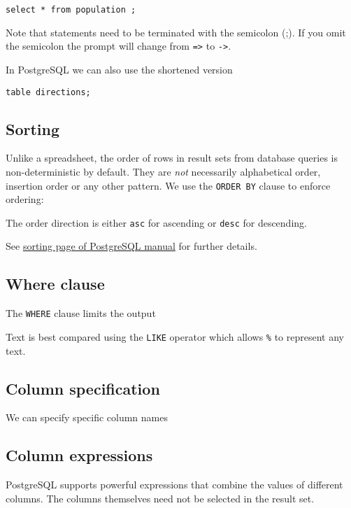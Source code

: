 \begin{verbatim}
select * from population ;
\end{verbatim}

Note that statements need to be terminated with the semicolon (;). If
you omit the semicolon the prompt will change from
\texttt{=\textgreater{}} to \texttt{-\textgreater{}}.

In PostgreSQL we can also use the shortened version

\begin{verbatim}
table directions;
\end{verbatim}

\subsection{Sorting}\label{sorting}

Unlike a spreadsheet, the order of rows in result sets from database
queries is non-deterministic by default. They are \emph{not} necessarily
alphabetical order, insertion order or any other pattern. We use the
\texttt{ORDER\ BY} clause to enforce ordering:

The order direction is either \texttt{asc} for ascending or
\texttt{desc} for descending.

See \href{https://www.postgresql.org/docs/13/queries-order.html}{sorting
page of PostgreSQL manual} for further details.

\subsection{Where clause}\label{where-clause}

The \texttt{WHERE} clause limits the output


Text is best compared using the \texttt{LIKE} operator which allows
\texttt{\%} to represent any text.


\subsection{Column specification}\label{column-specification}

We can specify specific column names


\subsection{Column expressions}\label{column-expressions}

PostgreSQL supports powerful expressions that combine the values of
different columns. The columns themselves need not be selected in the
result set.


